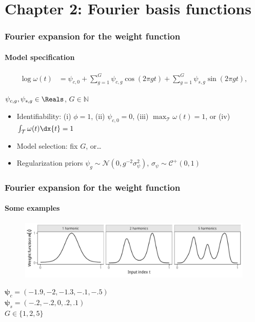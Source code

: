 \documentclass{snedecorbeamer}
\begin{document}
\section{Chapter 2: Fourier basis functions}

\begin{frame}
  \frametitle{Fourier expansion for the weight function}
  \framesubtitle{Model specification}

  \begin{align}
  \log\omega(t)
  \label{eq:few-log}
  &=\psi_{c,0} + \sum_{g = 1}^{G} \psi_{c,g}\cos\left(2\pi gt\right)
    + \sum_{g = 1}^{G} \psi_{s,g}\sin\left(2\pi gt\right),
  \end{align}

  \begin{center}
    $\psi_{c,g},\psi_{s,g}\in\Reals$, $G\in\mathbb{N}$
  \end{center}

  \vfill{}

  \begin{itemize}[<+(1)->]
  \item Identifiability: (i) $\phi = 1$, (ii) $\psi_{c,0} = 0$,
    (iii) $\max_\mathcal{T}\omega(t) = 1$, or (iv)
    $\int_\mathcal{T}\omega(t)\dx{t} = 1$
  \item Model selection: fix $G$, or\dots
  \item Regularization priors $\psi_g\sim\mathcal{N}(0,
    g^{-2}\sigma^2_\psi)$, $\sigma_\psi\sim\mathcal{C}^+(0, 1)$
  \end{itemize}

\end{frame}

\begin{frame}
  \frametitle{Fourier expansion for the weight function}
  \framesubtitle{Some examples}

  \begin{figure}
    \centering
    \includegraphics[width=1\textwidth]{syn01-weight-span}
  \end{figure}

  \begin{center}
    $\bm{\psi}_{c} = (-1.9, -2, -1.3, -.1, -.5)$\\
    $\bm{\psi}_{s} = (-.2, -.2, 0, .2, .1)$\\
    $G\in\{1, 2, 5\}$
  \end{center}
\end{frame}
\end{document}
